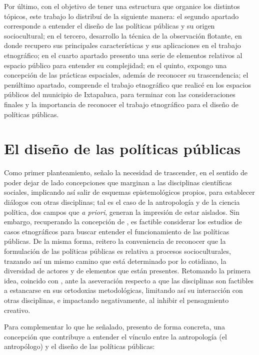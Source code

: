 \documentclass[
  spanish,
  11pt,
  a4paper,
]{scrbook}
\begin{document}
Por último, con el objetivo de tener una estructura que organice los
distintos tópicos, este trabajo lo distribuí de la siguiente manera: el
segundo apartado corresponde a entender el diseño de las políticas
públicas y su origen sociocultural; en el tercero, desarrollo la técnica
de la observación flotante, en donde recupero sus principales
características y sus aplicaciones en el trabajo etnográfico; en el
cuarto apartado presento una serie de elementos relativos al espacio
público para entender su complejidad; en el quinto, expongo una
concepción de las prácticas espaciales, además de reconocer su
trascendencia; el penúltimo apartado, comprende el trabajo etnográfico
que realicé en los espacios públicos del municipio de Ixtapaluca, para
terminar con las consideraciones finales y la importancia de reconocer
el trabajo etnográfico para el diseño de políticas públicas.

\section*{El diseño de las políticas
públicas}\label{el-diseuxf1o-de-las-poluxedticas-puxfablicas}


Como primer planteamiento, señalo la necesidad de trascender, en el
sentido de poder dejar de lado concepciones que marginan a las
disciplinas científicas sociales, implicando así salir de esquemas
epistemológicos propios, para establecer diálogos con otras disciplinas;
tal es el caso de la antropología y de la ciencia política, dos campos
que \emph{a priori}, generan la impresión de estar aislados. Sin
embargo, recuperando la concepción de \textcite{Shore2010} , es factible
considerar los estudios de casos etnográficos para buscar entender el
funcionamiento de las políticas públicas. De la misma forma, reitero la
conveniencia de reconocer que la formulación de las políticas públicas
es relativa a procesos socioculturales, trazando así un mismo camino que
está determinado por lo cotidiano, la diversidad de actores y de
elementos que están presentes. Retomando la primera idea, coincido con
\textcite{Shore2010} , ante la aseveración respecto a que las
disciplinas son factibles a estancarse en sus ortodoxias metodológicas,
limitando así su interacción con otras disciplinas, e impactando
negativamente, al inhibir el pensagmiento creativo.

Para complementar lo que he señalado, presento de forma concreta, una
concepción que contribuye a entender el vínculo entre la antropología
(el antropólogo) y el diseño de las políticas públicas:
\end{document}
